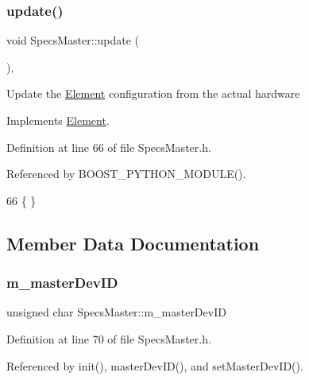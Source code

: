 \subsubsection{\texorpdfstring{update()}{update()}}
{\footnotesize\ttfamily void Specs\+Master\+::update (\begin{DoxyParamCaption}{ }\end{DoxyParamCaption})\hspace{0.3cm}{\ttfamily [inline]}, {\ttfamily [virtual]}}

Update the \hyperlink{classElement}{Element} configuration from the actual hardware 

Implements \hyperlink{classElement_a4e6c83efae95616ebddd03c793a26661}{Element}.



Definition at line 66 of file Specs\+Master.\+h.



Referenced by B\+O\+O\+S\+T\+\_\+\+P\+Y\+T\+H\+O\+N\+\_\+\+M\+O\+D\+U\+L\+E().


\begin{DoxyCode}
66 \{ \}
\end{DoxyCode}


\subsection{Member Data Documentation}
\mbox{\label{classSpecsMaster_a46913a84dbe228a115ee1b90c82e44e2}} 
\subsubsection{\texorpdfstring{m\+\_\+master\+Dev\+ID}{m\_masterDevID}}
{\footnotesize\ttfamily unsigned char Specs\+Master\+::m\+\_\+master\+Dev\+ID\hspace{0.3cm}{\ttfamily [private]}}



Definition at line 70 of file Specs\+Master.\+h.



Referenced by init(), master\+Dev\+I\+D(), and set\+Master\+Dev\+I\+D().

\mbox{\label{classSpecsMaster_a1a2b2ea916633b7eaee63589946e8909}} 

